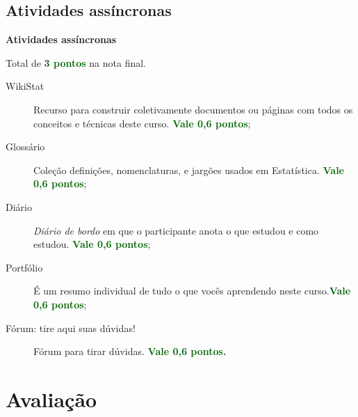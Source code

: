\documentclass[9pt]{beamer}
\begin{document}
\subsection{Atividades assíncronas}

\begin{frame}{}

\textbf{Atividades assíncronas}
\vfill


Total de \textcolor{darkgreen}{\bf 3 pontos} na nota final.
\begin{description}
	\item[WikiStat] Recurso para construir coletivamente documentos ou páginas com todos os conceitos e técnicas deste curso. \textcolor{darkgreen}{\bf Vale 0,6 pontos};
	\item[Glossário] Coleção definições, nomenclaturas, e jargões usados em Estatística. \textcolor{darkgreen}{\bf Vale 0,6 pontos};
	\item[Diário] \textit{Diário de bordo} em que o participante anota o que estudou e como estudou. \textcolor{darkgreen}{\bf  Vale 0,6 pontos};
	\item[Portfólio] É um resumo individual de tudo o que vocês aprendendo neste curso.\textcolor{darkgreen}{\bf Vale 0,6 pontos};
	\item[Fórum: tire aqui suas dúvidas!] Fórum para tirar dúvidas. \textcolor{darkgreen}{\bf Vale 0,6 pontos.}
\end{description}


\normalsize
\end{frame}

\section{Avaliação}
\end{document}
